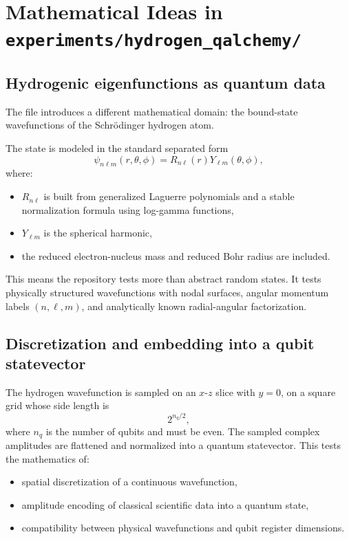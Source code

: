 \documentclass[11pt,a4paper]{article}
\begin{document}
\section{Mathematical Ideas in \texttt{experiments/hydrogen\_qalchemy/}}

\subsection{Hydrogenic eigenfunctions as quantum data}
The file  introduces a different mathematical domain: the bound-state wavefunctions of the Schr\"odinger hydrogen atom.

The state is modeled in the standard separated form
\[
\psi_{n\ell m}(r,\theta,\phi) = R_{n\ell}(r)Y_{\ell m}(\theta,\phi),
\]
where:
\begin{itemize}
  \item $R_{n\ell}$ is built from generalized Laguerre polynomials and a stable normalization formula using log-gamma functions,
  \item $Y_{\ell m}$ is the spherical harmonic,
  \item the reduced electron-nucleus mass and reduced Bohr radius are included.
\end{itemize}

This means the repository tests more than abstract random states. It tests physically structured wavefunctions with nodal surfaces, angular momentum labels $(n,\ell,m)$, and analytically known radial-angular factorization.

\subsection{Discretization and embedding into a qubit statevector}
The hydrogen wavefunction is sampled on an $x$-$z$ slice with $y=0$, on a square grid whose side length is
\[
2^{n_q/2},
\]
where $n_q$ is the number of qubits and must be even. The sampled complex amplitudes are flattened and normalized into a quantum statevector. This tests the mathematics of:
\begin{itemize}
  \item spatial discretization of a continuous wavefunction,
  \item amplitude encoding of classical scientific data into a quantum state,
  \item compatibility between physical wavefunctions and qubit register dimensions.
\end{itemize}
\end{document}
